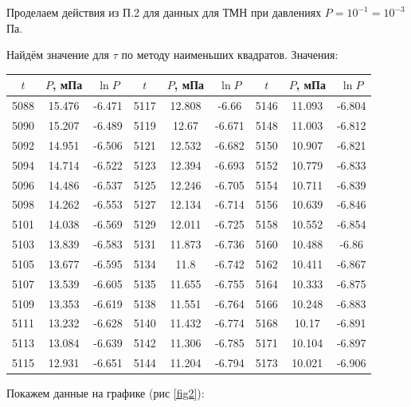\documentclass[a4paper,12pt]{article}
\begin{document}
\begin{enumerate}
\begin{enumerate}
	Проделаем действия из П.2 для данных для ТМН при давлениях $P = 10^{-1} = 10^{-3}$ Па.

Найдём значение для $\tau$ по методу наименьших квадратов. Значения:

\begin{center}
\begin{tabular}{|c|c|c|c|c|c|c|c|c|}
\hline 
$t$ & $P$, мПа & $\ln P$ & $t$ & $P$, мПа & $\ln P$ & $t$ & $P$, мПа & $\ln P$ \\ 
\hline 
5088 & 15.476 & -6.471 & 5117 & 12.808 & -6.66 & 5146 & 11.093 & -6.804 \\
\hline
5090 & 15.207 & -6.489 & 5119 & 12.67 & -6.671 & 5148 & 11.003 & -6.812 \\
\hline
5092 & 14.951 & -6.506 & 5121 & 12.532 & -6.682 & 5150 & 10.907 & -6.821 \\
\hline
5094 & 14.714 & -6.522 & 5123 & 12.394 & -6.693 & 5152 & 10.779 & -6.833 \\
\hline
5096 & 14.486 & -6.537 & 5125 & 12.246 & -6.705 & 5154 & 10.711 & -6.839 \\
\hline
5098 & 14.262 & -6.553 & 5127 & 12.134 & -6.714 & 5156 & 10.639 & -6.846 \\
\hline
5101 & 14.038 & -6.569 & 5129 & 12.011 & -6.725 & 5158 & 10.552 & -6.854 \\
\hline
5103 & 13.839 & -6.583 & 5131 & 11.873 & -6.736 & 5160 & 10.488 & -6.86 \\
\hline
5105 & 13.677 & -6.595 & 5134 & 11.8 & -6.742 & 5162 & 10.411 & -6.867 \\
\hline
5107 & 13.539 & -6.605 & 5135 & 11.655 & -6.755 & 5164 & 10.333 & -6.875 \\
\hline
5109 & 13.353 & -6.619 & 5138 & 11.551 & -6.764 & 5166 & 10.248 & -6.883 \\
\hline
5111 & 13.232 & -6.628 & 5140 & 11.432 & -6.774 & 5168 & 10.17 & -6.891 \\
\hline
5113 & 13.084 & -6.639 & 5142 & 11.306 & -6.785 & 5171 & 10.104 & -6.897 \\
\hline
5115 & 12.931 & -6.651 & 5144 & 11.204 & -6.794 & 5173 & 10.021 & -6.906 \\
\hline
\end{tabular} 
\end{center}

Покажем данные на графике (рис \ref{fig2}):


\end{enumerate}
\end{enumerate}
\end{document}
